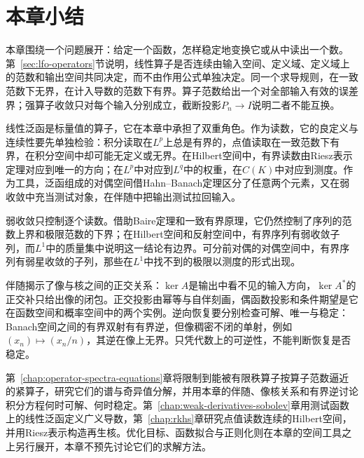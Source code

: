 
\section{本章小结}
\label{sec:lfo-summary}

本章围绕一个问题展开：给定一个函数，怎样稳定地变换它或从中读出一个数。第~\ref{sec:lfo-operators}节说明，线性算子是否连续由输入空间、定义域、定义域上的范数和输出空间共同决定，而不由作用公式单独决定。同一个求导规则，在一致范数下无界，在计入导数的范数下有界。算子范数给出一个对全部输入有效的误差界；强算子收敛只对每个输入分别成立，截断投影$P_n\to I$说明二者不能互换。

线性泛函是标量值的算子，它在本章中承担了双重角色。作为读数，它的良定义与连续性要先单独检验：积分读取在$L^p$上总是有界的，点值读取在一致范数下有界，在积分空间中却可能无定义或无界。在Hilbert空间中，有界读数由Riesz表示定理对应到唯一的方向；在$L^p$中对应到$L^q$中的权重，在$C(K)$中对应到测度。作为工具，泛函组成的对偶空间借Hahn--Banach定理区分了任意两个元素，又在弱收敛中充当测试对象，在伴随中把输出测试拉回输入。

弱收敛只控制逐个读数。借助Baire定理和一致有界原理，它仍然控制了序列的范数上界和极限范数的下界；在Hilbert空间和反射空间中，有界序列有弱收敛子列，而$L^1$中的质量集中说明这一结论有边界。可分前对偶的对偶空间中，有界序列有弱星收敛的子列，那些在$L^1$中找不到的极限以测度的形式出现。

伴随揭示了像与核之间的正交关系：$\ker A$是输出中看不见的输入方向，$\ker A^*$的正交补只给出像的闭包。正交投影由幂等与自伴刻画，偶函数投影和条件期望是它在函数空间和概率空间中的两个实例。逆向恢复要分别检查可解、唯一与稳定：Banach空间之间的有界双射有有界逆，但像稠密不闭的单射，例如$(x_n)\mapsto(x_n/n)$，其逆在像上无界。只凭代数上的可逆性，不能判断恢复是否稳定。

第~\ref{chap:operator-spectra-equations}章将限制到能被有限秩算子按算子范数逼近的紧算子，研究它们的谱与奇异值分解，并用本章的伴随、像核关系和有界逆讨论积分方程何时可解、何时稳定。第~\ref{chap:weak-derivatives-sobolev}章用测试函数上的线性泛函定义广义导数，第~\ref{chap:rkhs}章研究点值读数连续的Hilbert空间，并用Riesz表示构造再生核。优化目标、函数拟合与正则化则在本章的空间工具之上另行展开，本章不预先讨论它们的求解方法。

